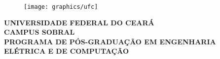\documentclass[
	12pt,				%
	openright,			%
	oneside,			%
	a4paper,			%
	chapter=TITLE,		%
	section=TITLE,		%
	english,			%
	french,				%
	spanish,			%
	brazil				%
	]{abntex2}
\begin{document}
\frenchspacing 

\pretextual

\begin{figure}
\centering
\texttt{[image: graphics/ufc]}
\end{figure}

\begin{center}
\ABNTEXchapterfont\large
\textbf{UNIVERSIDADE FEDERAL DO CEARÁ} \\
\textbf{CAMPUS SOBRAL} \\
\textbf{PROGRAMA DE PÓS-GRADUAÇÃO EM ENGENHARIA ELÉTRICA E DE COMPUTAÇÃO} \\
\vspace{1cm}
\ABNTEXchapterfont\large

\end{center}

\vspace{1cm}

\imprimircapa


\setlength\parindent{0pt}

\begin{folhadeaprovacao}
	
	\begin{center}
		{\ABNTEXchapterfont\large\imprimirautor}
		
		\vspace{-8cm}
		
		\vspace*{\fill}\vspace*{\fill}
		\begin{center}
			\ABNTEXchapterfont\bfseries\Large\imprimirtitulo
		\end{center}
		\vspace*{\fill}
		
		\hspace{.45\textwidth}
		\begin{minipage}{.5\textwidth}
			\imprimirpreambulo
		\end{minipage}%
		\vspace*{\fill}
	\end{center}
	
	\vspace{-1cm}
	
	
\end{folhadeaprovacao}
\end{document}
